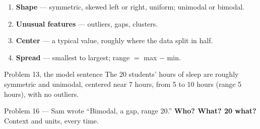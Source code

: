 \documentclass[aspectratio=169, 11pt]{beamer}
\newcommand{\redink}[1]{{\color{redacc}\bfseries #1}}
\begin{document}
\begin{frame}[t, plain]
  \begin{enumerate}\setlength{\itemsep}{3pt}
    \item \textbf{Shape} --- symmetric, skewed left or right, uniform; unimodal or bimodal.
    \item \textbf{Unusual features} --- outliers, gaps, clusters.
    \item \textbf{Center} --- a typical value, roughly where the data split in half.
    \item \textbf{Spread} --- smallest to largest; range $=$ max $-$ min.
  \end{enumerate}
  \begin{block}{Problem 13, the model sentence}
    The 20 students' hours of sleep are roughly symmetric and unimodal, centered near 7 hours,
    from 5 to 10 hours (range 5 hours), with no outliers.
  \end{block}
  \vspace{2pt}
  {\small Problem 16 --- Sam wrote ``Bimodal, a gap, range 20.'' \redink{Who? What? 20 what?}
  Context and units, every time.}
\end{frame}
\end{document}
